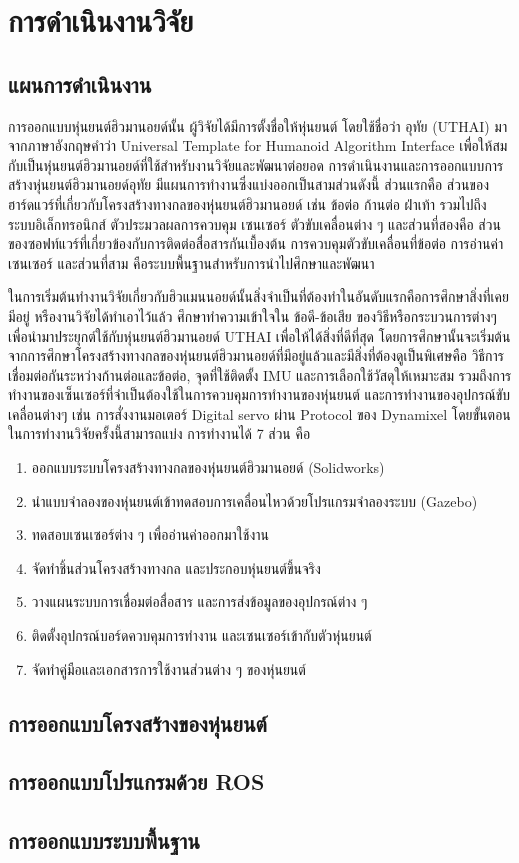 \chapter{การดำเนินงานวิจัย}
\section{แผนการดำเนินงาน}
การออกแบบหุ่นยนต์ฮิวมานอยด์นั้น ผู้วิจัยได้มีการตั้งชื่อให้หุ่นยนต์ โดยใช้ชื่อว่า อุทัย (UTHAI)
มาจากภาษาอังกฤษคำว่า Universal Template for Humanoid Algorithm Interface
เพื่อให้สมกับเป็นหุ่นยนต์ฮิวมานอยด์ที่ใช้สำหรับงานวิจัยและพัฒนาต่อยอด
การดำเนินงานและการออกแบบการสร้างหุ่นยนต์ฮิวมานอยด์อุทัย มีแผนการทำงานซึ่งแบ่งออกเป็นสามส่วนดังนี้
ส่วนแรกคือ ส่วนของฮาร์ดแวร์ที่เกี่ยวกับโครงสร้างทางกลของหุ่นยนต์ฮิวมานอยด์ เช่น ข้อต่อ ก้านต่อ ฝ่าเท้า
รวมไปถึงระบบอิเล็กทรอนิกส์ ตัวประมวลผลการควบคุม เซนเซอร์ ตัวขับเคลื่อนต่าง ๆ และส่วนที่สองคือ
ส่วนของซอฟท์แวร์ที่เกี่ยวข้องกับการติดต่อสื่อสารกันเบื้องต้น การควบคุมตัวขับเคลื่อนที่ข้อต่อ การอ่านค่าเซนเซอร์
และส่วนที่สาม คือระบบพื้นฐานสำหรับการนำไปศึกษาและพัฒนา

ในการเริ่มต้นทำงานวิจัยเกี่ยวกับฮิวแมนนอยด์นั้นสิ่งจำเป็นที่ต้องทำในอันดับแรกคือการศึกษาสิ่งที่เคยมีอยู่ หรืองานวิจัยได้ทำเอาไว้แล้ว
ศึกษาทำความเข้าใจใน ข้อดี-ข้อเสีย ของวิธีหรือกระบวนการต่างๆ เพื่อนำมาประยุกต์ใช้กับหุ่นยนต์ฮิวมานอยด์ UTHAI เพื่อให้ได้สิ่งที่ดีที่สุด
โดยการศึกษานั้นจะเริ่มต้นจากการศึกษาโครงสร้างทางกลของหุ่นยนต์ฮิวมานอยด์ที่มีอยู่แล้วและมีสิ่งที่ต้องดูเป็นพิเศษคือ
วิธีการเชื่อมต่อกันระหว่างก้านต่อและข้อต่อ, จุดที่ใช้ติดตั้ง IMU และการเลือกใช้วัสดุให้เหมาะสม
รวมถึงการทำงานของเซ็นเซอร์ที่จำเป็นต้องใช้ในการควบคุมการทำงานของหุ่นยนต์ และการทำงานของอุปกรณ์ขับเคลื่อนต่างๆ
เช่น การสั่งงานมอเตอร์ Digital servo ผ่าน Protocol ของ Dynamixel โดยขั้นตอนในการทำงานวิจัยครั้งนี้สามารถแบ่ง
การทำงานได้ 7 ส่วน คือ

\begin{enumerate}
    \item ออกแบบระบบโครงสร้างทางกลของหุ่นยนต์ฮิวมานอยด์ (Solidworks)
    \item นำแบบจำลองของหุ่นยนต์เข้าทดสอบการเคลื่อนไหวด้วยโปรแกรมจำลองระบบ (Gazebo)
    \item ทดสอบเซนเซอร์ต่าง ๆ เพื่ออ่านค่าออกมาใช้งาน
    \item จัดทำชิ้นส่วนโครงสร้างทางกล และประกอบหุ่นยนต์ขึ้นจริง
    \item วางแผนระบบการเชื่อมต่อสื่อสาร และการส่งข้อมูลของอุปกรณ์ต่าง ๆ
    \item ติดตั้งอุปกรณ์บอร์ดควบคุมการทำงาน และเซนเซอร์เข้ากับตัวหุ่นยนต์
    \item จัดทำคู่มือและเอกสารการใช้งานส่วนต่าง ๆ ของหุ่นยนต์ 
\end{enumerate}


\clearpage
\section{การออกแบบโครงสร้างของหุ่นยนต์}


\clearpage
\section{การออกแบบโปรแกรมด้วย ROS}


\clearpage
\section{การออกแบบระบบพื้นฐาน}

